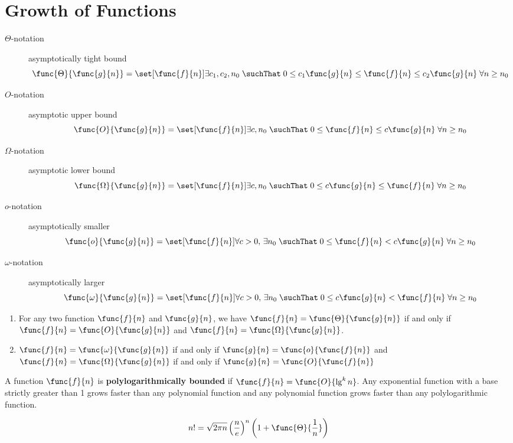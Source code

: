 \chapter{Growth of Functions}
\begin{definition} \leavevmode
    \begin{description}
        \item[\(\Theta\)-notation] asymptotically tight bound
              \[ \func{\Theta}{\func{g}{n}} = \set[\func{f}{n}]{ \exists c_1,c_2,n_0 \; \suchThat \; 0 \leq c_1\func{g}{n} \leq \func{f}{n} \leq c_2 \func{g}{n} \; \forall n \geq n_0} \]
        \item [\(O\)-notation] asymptotic upper bound
              \[ \func{O}{\func{g}{n}} = \set[\func{f}{n}]{ \exists c,n_0 \; \suchThat \; 0 \leq \func{f}{n} \leq c \func{g}{n} \; \forall n \geq n_0} \]
        \item [\(\Omega\)-notation] asymptotic lower bound
              \[ \func{\Omega}{\func{g}{n}} = \set[\func{f}{n}]{ \exists c,n_0 \; \suchThat \; 0 \leq c \func{g}{n} \leq \func{f}{n} \; \forall n \geq n_0} \]
        \item [\(o\)-notation] asymptotically smaller
              \[ \func{o}{\func{g}{n}} = \set[\func{f}{n}]{ \forall c > 0, \, \exists n_0 \; \suchThat \; 0 \leq \func{f}{n} < c \func{g}{n} \; \forall n \geq n_0} \]
        \item [\(\omega\)-notation] asymptotically larger
              \[ \func{\omega}{\func{g}{n}} = \set[\func{f}{n}]{ \forall c > 0, \, \exists n_0 \; \suchThat \; 0 \leq c \func{g}{n}< \func{f}{n}  \; \forall n \geq n_0} \]
    \end{description}
\end{definition}

\begin{proposition} \leavevmode
    \begin{enumerate}
        \item For any two function \(\func{f}{n}\) and \(\func{g}{n}\), we have \(\func{f}{n} = \func{\Theta}{\func{g}{n}}\) if and only if \(\func{f}{n} = \func{O}{\func{g}{n}}\) and \(\func{f}{n} = \func{\Omega}{\func{g}{n}}\).
        \item \(\func{f}{n} = \func{\omega}{\func{g}{n}}\) if and only if \(\func{g}{n} = \func{o}{\func{f}{n}}\) and \(\func{f}{n} = \func{\Omega}{\func{g}{n}}\) if and only if \(\func{g}{n} = \func{O}{\func{f}{n}}\)
    \end{enumerate}
\end{proposition}
A function \(\func{f}{n}\) is \textbf{polylogarithmically bounded} if  \(\func{f}{n} = \func{O}{\lg^k n}\). Any exponential function with a base strictly greater than 1 grows faster than any polynomial function and any polynomial function grows faster than any polylogarithmic function.
\begin{remark}
    \begin{equation}
        n! = \sqrt{2\pi n} \left(\frac{n}{e}\right)^n \left(1 + \func{\Theta}{\frac{1}{n}}\right)
    \end{equation}
\end{remark}

